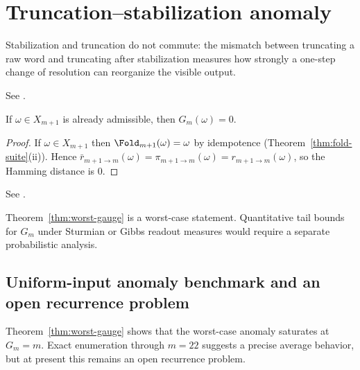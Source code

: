 \section{Truncation--stabilization anomaly}\label{app:gauge}

Stabilization and truncation do not commute: the mismatch between truncating a raw word and truncating after stabilization measures how strongly a one-step change of resolution can reorganize the visible output.

\begin{definition}\label{def:gauge-anomaly}
See \cite[Definition~7.3]{MaZhang2026Nonlinearity}.
\end{definition}

\begin{proposition}\label{prop:gauge-onshell}
If $\omega\in X_{m+1}$ is already admissible, then $G_m(\omega)=0$.
\end{proposition}

\begin{proof}
If $\omega\in X_{m+1}$ then $\Fold_{m+1}(\omega)=\omega$ by idempotence (Theorem~\ref{thm:fold-suite}(ii)). Hence
$\bar r_{m+1\to m}(\omega)=\pi_{m+1\to m}(\omega)=r_{m+1\to m}(\omega)$, so the Hamming distance is $0$.
\end{proof}

\begin{theorem}\label{thm:worst-gauge}
See \cite[Theorem~7.4]{MaZhang2026Nonlinearity}.
\end{theorem}

\begin{remark}
Theorem~\ref{thm:worst-gauge} is a worst-case statement. Quantitative tail bounds for $G_m$ under Sturmian or Gibbs readout measures would require a separate probabilistic analysis.
\end{remark}

\subsection{Uniform-input anomaly benchmark and an open recurrence problem}\label{app:gauge-rate}

Theorem~\ref{thm:worst-gauge} shows that the worst-case anomaly saturates at $G_m=m$. Exact enumeration through $m=22$ suggests a precise average behavior, but at present this remains an open recurrence problem.

